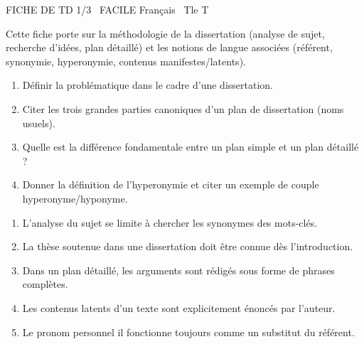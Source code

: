 \documentclass[11pt]{article}
\begin{document}
\begin{tcolorbox}[enhanced,colback=popink,colframe=popink,arc=10pt,boxrule=0pt,left=12pt,right=12pt,top=9pt,bottom=9pt]
{\color{white}\popxbold\small FICHE DE TD 1/3 \textbullet\ FACILE \hfill Français \textbullet\ Tle T\par}
\end{tcolorbox}
\vspace{4pt}
Cette fiche porte sur la méthodologie de la dissertation (analyse de sujet, recherche d'idées, plan détaillé) et les notions de langue associées (référent, synonymie, hyperonymie, contenus manifestes/latents).

\begin{exercice}
\begin{enumerate}
    \item Définir la \og problématique \fg{} dans le cadre d'une dissertation.
    \item Citer les trois grandes parties canoniques d'un plan de dissertation (noms usuels).
    \item Quelle est la différence fondamentale entre un \og plan simple \fg{} et un \og plan détaillé \fg{} ?
    \item Donner la définition de l'hyperonymie et citer un exemple de couple hyperonyme/hyponyme.
\end{enumerate}
\end{exercice}

\begin{exercice}
\begin{enumerate}
    \item L'analyse du sujet se limite à chercher les synonymes des mots-clés.
    \item La thèse soutenue dans une dissertation doit être connue dès l'introduction.
    \item Dans un plan détaillé, les arguments sont rédigés sous forme de phrases complètes.
    \item Les contenus latents d'un texte sont explicitement énoncés par l'auteur.
    \item Le pronom personnel \og il \fg{} fonctionne toujours comme un substitut du référent.
\end{enumerate}
\end{exercice}
\end{document}
